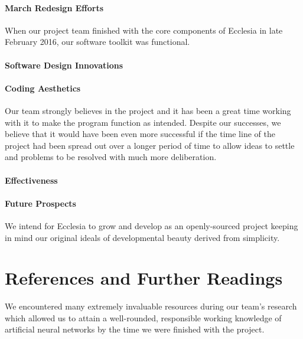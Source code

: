 \documentclass[letterpaper, 10pt]{article}
\begin{document}
	\paragraph{March Redesign Efforts}
	When our project team finished with the core components of Ecclesia in late February 2016, our software toolkit was functional.
	
	\paragraph{Software Design Innovations}
	
	\paragraph{Coding Aesthetics}
	
	Our team strongly believes in the project and it has been a great time working with it to make the program function as intended. Despite our successes, we believe that it would have been even more successful if the time line of the project had been spread out over a longer period of time to allow ideas to settle and problems to be resolved with much more deliberation.
	
	\paragraph{Effectiveness}
	
	\paragraph{Future Prospects}
	We intend for Ecclesia to grow and develop as an openly-sourced project keeping in mind our original ideals of developmental beauty derived from simplicity.
\cleardoublepage
\section{References and Further Readings}
	We encountered many extremely invaluable resources during our team's research which allowed us to attain a well-rounded, responsible working knowledge of artificial neural networks by the time we were finished with the project.

	\large
	\vspace{0.65cm}
\end{document}

